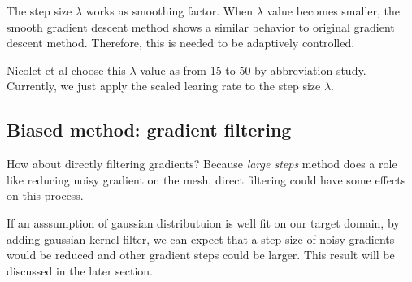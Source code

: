 The step size $\lambda$ works as smoothing factor. When $\lambda$ value becomes smaller, the smooth gradient descent method shows a similar behavior to original gradient descent method. Therefore, this is needed to be adaptively controlled.

Nicolet et al\cite{Nicolet2021Large} choose this $\lambda$ value as from 15 to 50 by abbreviation study. Currently, we just apply the scaled learing rate to the step size $\lambda$.

\subsection*{Biased method: gradient filtering}

How about directly filtering gradients? Because \emph{large steps} method does a role like reducing noisy gradient on the mesh, direct filtering could have some effects on this process.

If an asssumption of gaussian distributuion is well fit on our target domain, by adding gaussian kernel filter, we can expect that a step size of noisy gradients would be reduced and other gradient steps could be larger. This result will be discussed in the later section.
